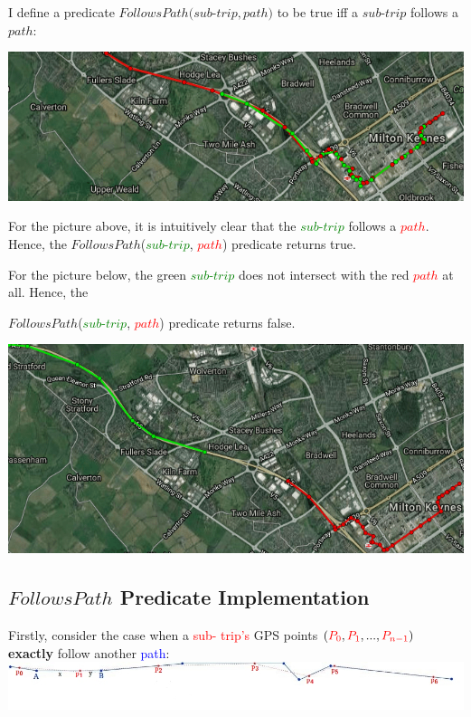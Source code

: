 \documentclass[12pt,a4paper,oneside,openright]{report}
\begin{document}
I define a predicate $FollowsPath(sub$-$trip, path)$ to be true iff a $sub$-$trip$
follows a $path$:

\includegraphics[width=\textwidth]{figs/follows.png}

For the picture above, it is intuitively clear that the \textcolor{green}{$sub$-$trip$}
follows a \textcolor{red}{$path$}. Hence, the $FollowsPath$(\textcolor{green}{$sub$-$trip$}, 
\textcolor{red}{$path$}) predicate returns true.

\:
\:
\:


For the picture below, the green \textcolor{green}{$sub$-$trip$} does not intersect with the 
red \textcolor{red}{$path$} at all. Hence, the

$FollowsPath$(\textcolor{green}{$sub$-$trip$}, \textcolor{red}{$path$}) predicate returns false.

\includegraphics[width=\textwidth]{figs/not_follows_path.png}


\subsection{$FollowsPath$ Predicate Implementation}

Firstly, consider the case when a \textcolor{red}{sub- trip's} GPS points
$(\textcolor{red}{P_0}, \textcolor{red}{P_1}, ..., \textcolor{red}{P_{n-1}})$
\textbf{exactly} follow another \textcolor{blue}{path}: \\

\includegraphics[width=\textwidth]{figs/follows_exactly.jpg}
\end{document}
